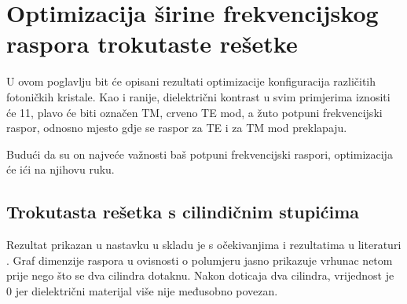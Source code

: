 \documentclass[utf8, seminar, numeric]{fer}
\begin{document}
\chapter{Optimizacija širine frekvencijskog raspora trokutaste rešetke}

U ovom poglavlju bit će opisani rezultati optimizacije konfiguracija različitih
fotoničkih kristale. Kao i ranije, dielektrični kontrast u svim primjerima iznositi će
11, plavo će biti označen TM, crveno TE mod, a žuto potpuni frekvencijski raspor,
odnosno mjesto gdje se raspor za TE i za TM mod preklapaju.

Budući da su on najveće važnosti baš potpuni frekvencijski raspori, optimizacija
će ići na njihovu ruku.

\section{Trokutasta rešetka s cilindičnim stupićima}

Rezultat prikazan u nastavku u skladu je s očekivanjima i rezultatima u literaturi
\cite{joannopoulos2011photonic}. Graf dimenzije raspora u ovisnosti o polumjeru
jasno prikazuje vrhunac netom prije nego što se dva cilindra dotaknu. Nakon doticaja
dva cilindra, vrijednost je 0 jer dielektrični materijal više nije međusobno povezan.
\end{document}
